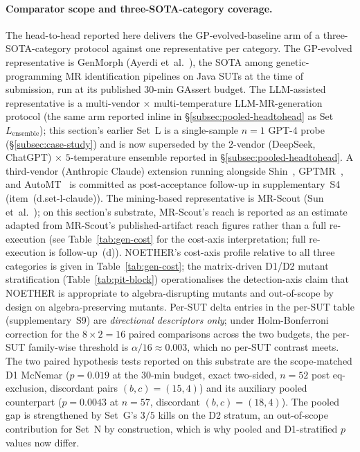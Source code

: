 \documentclass[acmsmall,screen,review]{acmart}
\begin{document}
\paragraph{Comparator scope and three-SOTA-category coverage.}
The head-to-head reported here delivers the GP-evolved-baseline arm
of a three-SOTA-category protocol against one representative per
category. The GP-evolved representative is GenMorph (Ayerdi
et~al.~\cite{GenMorph2024}), the SOTA among
genetic-programming MR identification pipelines on Java SUTs at the
time of submission, run at its published 30-min GAssert budget. The
LLM-assisted representative is a multi-vendor $\times$
multi-temperature LLM-MR-generation protocol (the same arm reported
inline in \S\ref{subsec:pooled-headtohead} as Set~$L_{\mathrm{ensemble}}$);
this section's earlier Set~L is a single-sample $n = 1$ GPT-4 probe
(\S\ref{subsec:case-study}) and is now superseded by the
$2$-vendor (DeepSeek, ChatGPT) $\times$ $5$-temperature ensemble
reported in \S\ref{subsec:pooled-headtohead}. A third-vendor
(Anthropic Claude) extension running alongside
Shin~\cite{Shin2024}, GPTMR~\cite{GPTMR2025}, and
AutoMT~\cite{AutoMT2025} is committed as
post-acceptance follow-up in supplementary~S4 (item~(d.set-l-claude)). The
mining-based representative is MR-Scout (Sun
et~al.~\cite{MRScout2024}); on this section's substrate, MR-Scout's
reach is reported as an estimate adapted from MR-Scout's
published-artifact reach figures rather than a full re-execution
(see Table~\ref{tab:gen-cost} for the cost-axis interpretation;
full re-execution is follow-up~(d)). NOETHER's cost-axis profile
relative to all three categories is given in
Table~\ref{tab:gen-cost}; the matrix-driven D1/D2 mutant
stratification (Table~\ref{tab:pit-block}) operationalises the
detection-axis claim that NOETHER is appropriate to algebra-disrupting
mutants and out-of-scope by design on algebra-preserving mutants.
Per-SUT delta entries in the per-SUT table (supplementary~S9) are
\emph{directional descriptors only}; under Holm-Bonferroni
correction for the $8 \times 2 = 16$ paired comparisons across the
two budgets, the per-SUT family-wise threshold is $\alpha/16 \approx
0.003$, which no per-SUT contrast meets. The two paired hypothesis
tests reported on this substrate are the scope-matched D1 McNemar
($p = 0.019$ at the 30-min budget, exact two-sided, $n = 52$ post
eq-exclusion, discordant pairs $(b, c) = (15, 4)$) and its
auxiliary pooled counterpart ($p = 0.0043$ at $n = 57$, discordant
$(b, c) = (18, 4)$). The pooled gap is strengthened by Set~G's
$3/5$ kills on the D2 stratum, an out-of-scope contribution
for Set~N by construction, which is why pooled and D1-stratified
$p$ values now differ.
\end{document}
